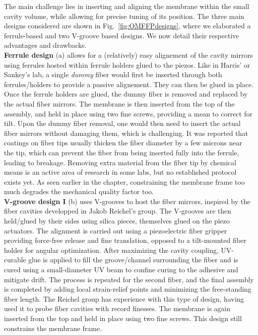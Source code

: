 The main challenge lies in inserting and aligning the membrane within the small cavity volume, while allowing for precise tuning of its position. The three main designs considered are shown in Fig.~\ref{fig:OMFFPdesigns}, where we elaborated a ferrule-based and two V-groove based designs. We now detail their respective advantages and drawbacks. \\


\noindent \textbf{Ferrule design} (a) allows for a (relatively) easy alignement of the cavity mirrors using ferrules hosted within ferrule holders glued to the piezos. Like in Harris' or Sankey's lab, a single \textit{dummy} fiber would first be inserted through both ferrules/holders to provide a passive alignement. They can then be glued in place. Once the ferrule holders are glued, the dummy fiber is removed and replaced by the actual fiber mirrors. The membrane is then inserted from the top of the assembly, and held in place using two fine screws, providing a mean to correct for tilt. Upon the dummy fiber removal, one would then need to insert the actual fiber mirrors without damaging them, which is challenging. It was reported that coatings on fiber tips usually thicken the fiber diameter by a few microns near the tip, which can prevent the fiber from being inserted fully into the ferrule, leading to breakage. Removing extra material from the fiber tip by chemical means is an active area of research in some labs, but no established protocol exists yet. As seen earlier in the chapter, constraining the membrane frame too much degrades the mechanical quality factor too. \\

\noindent \textbf{V-groove design I} (b) uses V-grooves to host the fiber mirrors, inspired by the fiber cavities developped in Jakob Reichel's group. The V-grooves are then held/glued by their sides using silica pieces, themselves glued on the piezo actuators. The alignment is carried out using a piezoelectric fiber gripper providing force-free release and fine translation, opposed to a tilt-mounted fiber holder for angular optimization. After maximizing the cavity coupling, UV-curable glue is applied to fill the groove/channel surrounding the fiber and is cured using a small-diameter UV beam to confine curing to the adhesive and mitigate drift. The process is repeated for the second fiber, and the final assembly is completed by adding local strain-relief points and minimizing the free-standing fiber length. The Reichel group has experience with this type of design, having used it to probe fiber cavities with record finesses. The membrane is again inserted from the top and held in place using two fine screws. This design still constrains the membrane frame. \\

